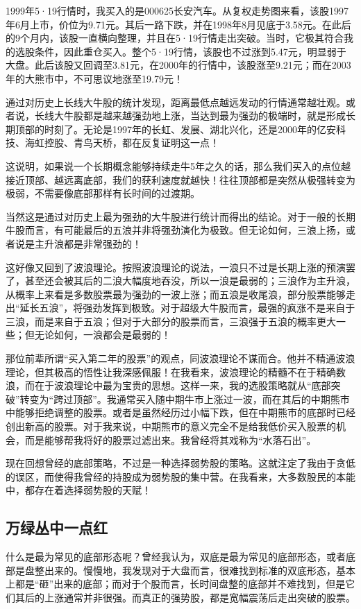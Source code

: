 1999年5·19行情时，我买入的是000625长安汽车。从复权走势图来看，该股1997年6月上市，价位为9.71元。其后一路下跌，并在1998年8月见底于3.58元。在此后的9个月内，该股一直横向整理，并且在5·19行情走出突破。当时，它极其符合我的选股条件，因此重仓买入。整个5·19行情，该股也不过涨到5.47元，明显弱于大盘。此后该股又回调至3.81元，在2000年的行情中，该股涨至9.21元；而在2003年的大熊市中，不可思议地涨至19.79元！

通过对历史上长线大牛股的统计发现，距离最低点越远发动的行情通常越壮观。或者说，长线大牛股都是越来越强劲地上涨，当达到最为强劲的极端时，就是形成长期顶部的时刻了。无论是1997年的长虹、发展、湖北兴化，还是2000年的亿安科技、海虹控股、青鸟天桥，都在反复证明这一点！

这说明，如果说一个长期概念能够持续走牛5年之久的话，那么我们买入的点位越接近顶部、越远离底部，我们的获利速度就越快！往往顶部都是突然从极强转变为极弱，不需要像底部那样有长时间的过渡期。

当然这是通过对历史上最为强劲的大牛股进行统计而得出的结论。对于一般的长期牛股而言，有可能最后的五浪并非将强劲演化为极致。但无论如何，三浪上扬，或者说是主升浪都是非常强劲的！

这好像又回到了波浪理论。按照波浪理论的说法，一浪只不过是长期上涨的预演罢了，甚至还会被其后的二浪大幅度地吞没，所以一浪是最弱的；三浪作为主升浪，从概率上来看是多数股票最为强劲的一波上涨；而五浪是收尾浪，部分股票能够走出“延长五浪”，将强劲发挥到极致。对于超级大牛股而言，最强的疯涨不是来自于三浪，而是来自于五浪；但对于大部分的股票而言，三浪强于五浪的概率更大一些；但无论如何，一浪都会是最弱的！

那位前辈所谓“买入第二年的股票”的观点，同波浪理论不谋而合。他并不精通波浪理论，但其极高的悟性让我深感佩服！在我看来，波浪理论的精髓不在于精确数浪，而在于波浪理论中最为宝贵的思想。这样一来，我的选股策略就从“底部突破”转变为“跨过顶部”。我通常买入随中期牛市上涨过一波，而在其后的中期熊市中能够拒绝调整的股票。或者是虽然经历过小幅下跌，但在中期熊市的底部时已经创出新高的股票。对于我来说，中期熊市的意义完全不是给我低价买入股票的机会，而是能够帮我将好的股票过滤出来。我曾经将其戏称为“水落石出”。

现在回想曾经的底部策略，不过是一种选择弱势股的策略。这就注定了我由于贪低的误区，而使得我曾经的持股成为弱势股的集中营。在我看来，大多数股民的本能中，都存在着选择弱势股的天赋！

\subsection{万绿丛中一点红}

什么是最为常见的底部形态呢？曾经我认为，双底是最为常见的底部形态，或者底部是盘整出来的。慢慢地，我发现对于大盘而言，很难找到标准的双底形态，基本上都是“砸”出来的底部；而对于个股而言，长时间盘整的底部并不难找到，但是它们其后的上涨通常并非很强。而真正的强势股，都是宽幅震荡后走出突破的股票。

